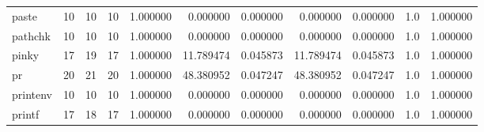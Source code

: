 \begin{longtable}{lrrrrrrrrrr}
paste     &                                      10 &                 10 &                                10 &                                   1.000000 &                               0.000000 &                                     0.000000 &                          0.000000 &                                0.000000 &                                1.0 &                                           1.000000 \\
pathchk   &                                      10 &                 10 &                                10 &                                   1.000000 &                               0.000000 &                                     0.000000 &                          0.000000 &                                0.000000 &                                1.0 &                                           1.000000 \\
pinky     &                                      17 &                 19 &                                17 &                                   1.000000 &                              11.789474 &                                     0.045873 &                         11.789474 &                                0.045873 &                                1.0 &                                           1.000000 \\
pr        &                                      20 &                 21 &                                20 &                                   1.000000 &                              48.380952 &                                     0.047247 &                         48.380952 &                                0.047247 &                                1.0 &                                           1.000000 \\
printenv  &                                      10 &                 10 &                                10 &                                   1.000000 &                               0.000000 &                                     0.000000 &                          0.000000 &                                0.000000 &                                1.0 &                                           1.000000 \\
printf    &                                      17 &                 18 &                                17 &                                   1.000000 &                               0.000000 &                                     0.000000 &                          0.000000 &                                0.000000 &                                1.0 &                                           1.000000 \\

\end{longtable}
